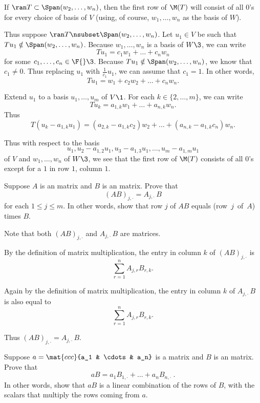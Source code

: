 \begin{Solution}
If $\ran T \subset \Span(w_2, \dots, w_n)$, then the first row of $\M(T)$ will consist of all $0$'s for every choice of basis of $V$ (using, of course, $w_1, \dots, w_n$ as the basis of $W$).

Thus suppose $\ran T \nsubset \Span(w_2, \dots, w_n)$. Let $u_1 \in V$ be such that $Tu_1 \notin \Span(w_2, \dots, w_n)$. Because $w_1, \dots, w_n$ is a basis of $W\3$, we can write
\[
Tu_1 = c_1 w_1 + \dots + c_n w_n
\]
for some $c_1, \dots, c_n \in \F{}\3$. Because $Tu_1 \notin \Span(w_2, \dots, w_n)$, we know that $c_1 \ne 0$. Thus replacing $u_1$ with $\frac{1}{c_1}u_1$, we can assume that $c_1 = 1$. In other words,
\[
Tu_1 = w_1 + c_2 w_2 + \dots + c_n w_n.
\]

Extend $u_1$ to a basis $u_1, \dots, u_m$ of $V\1$. For each $k \in \{2, \dots, m\}$, we can write
\[
Tu_k = a_{1,k} w_1 + \dots + a_{n,k} w_n.
\]
Thus
\[
T(u_k - a_{1,k} u_1) = (a_{2,k} - a_{1,k}c_2) w_2 + \dots + (a_{n,k} - a_{1,k}c_n) w_n.
\]

Thus with respect to the basis
\[
u_1, u_2 - a_{1, 2} u_1, u_3 - a_{1, 3} u_1, \dots, u_m - a_{1, m} u_1
\]
 of $V$ and
$w_1, \dots, w_n$ of $W\3$, we see that the first row of $\M(T)$ consists of all $0$'s except for a $1$ in row $1$, column $1$.
\end{Solution}

\exercise
Suppose $A$ is an  matrix and $B$ is an  matrix. Prove that \label{3think1}
\[
(AB)_{j,\cdot} = A_{j,\cdot} \, B
\]
for each $1 \le j \le m$. In other words, show that row $j$ of $AB$ equals (row~$j$~of~$A$) times $B$.

\begin{Solution}
Note that both $(AB)_{j,\cdot}$ and  $A_{j,\cdot} \, B$ are  matrices.

By the  definition of matrix multiplication, the entry in column $k$ of $(AB)_{j,\cdot}$ is
\[
\sum_{r=1}^n A_{j,r} B_{r, k}.
\]

Again by the  definition of matrix multiplication, the entry in column $k$ of $A_{j,\cdot} \, B$ is also equal to
\[
\sum_{r=1}^n A_{j,r} B_{r, k}.
\]

Thus $(AB)_{j,\cdot} = A_{j,\cdot} \, B$.
\end{Solution}

\exercise
Suppose $a = \mat{ccc}{a_1 & \cdots & a_n}$ is a  matrix and $B$ is an  matrix. Prove that \label{3think2}
\[
aB = a_1 B_{1, \cdot} + \dots + a_n B_{n, \cdot}\ .
\]
In other words, show that $aB$ is a linear combination of the rows of $B$, with the scalars that multiply the rows coming from $a$.

